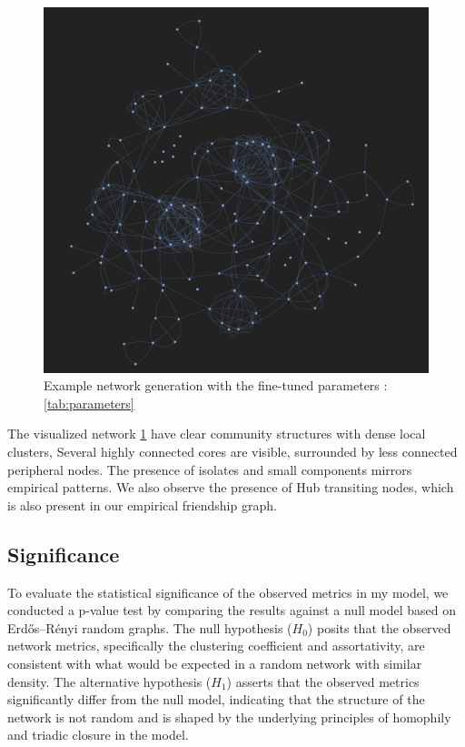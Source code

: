 \documentclass[runningheads]{llncs}
\begin{document}
 \begin{figure}[h]
     \centering
     \includegraphics[width=0.9\linewidth]{figures/model_example_generation.png}
     \caption{Example network generation with the fine-tuned parameters : \ref{tab:parameters}}
     \label{fig:example_generationl}
 \end{figure}
 
The visualized network \ref{fig:example_generationl} have clear community structures with dense local clusters,  Several highly connected cores are visible, surrounded by less connected peripheral nodes. The presence of isolates and small components mirrors empirical patterns. We also observe the presence of Hub transiting nodes, which is also present in our empirical friendship graph.

\subsection{Significance}
 To evaluate the statistical significance of the observed metrics in my model, we conducted a p-value test by comparing the results against a null model based on Erdős–Rényi random graphs. The null hypothesis ($H_0$) posits that the observed network metrics, specifically the clustering coefficient and assortativity, are consistent with what would be expected in a random network with similar density. The alternative hypothesis ($H_1$) asserts that the observed metrics significantly differ from the null model, indicating that the structure of the network is not random and is shaped by the underlying principles of homophily and triadic closure in the model.
\end{document}
